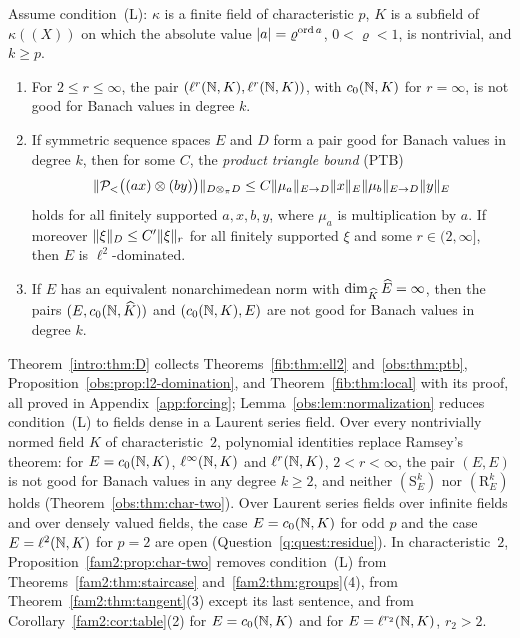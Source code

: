 \begin{introtheorem}[forcing]\label{intro:thm:D}
Assume condition~\textup{(L)}: $\kappa$ is a finite field of characteristic $p$, $K$ is a subfield of $\kappa((X))$ on
which the absolute value $\lvert a\rvert=\varrho^{\operatorname{ord} a}$, $0<\varrho<1$, is nontrivial, and $k\ge p$.
\begin{enumerate}
\item For $2\le r\le\infty$, the pair $(\ell^r(\mathbb N,K),\ell^r(\mathbb N,K))$, with $c_0(\mathbb N,K)$ for $r=\infty$, is not good for
Banach values in degree $k$.
\item If symmetric sequence spaces $E$ and $D$ form a pair good for Banach values in degree $k$, then for some $C$, the
\emph{product triangle bound} \textup{(PTB)}
\[
 \lVert \mathcal P_<\bigl((ax)\otimes(by)\bigr)\rVert_{D\otimes_\pi D}
 \le C\lVert \mu_a\rVert_{E\to D}\lVert x\rVert_E\lVert \mu_b\rVert_{E\to D}\lVert y\rVert_E
\]
holds for all finitely supported $a,x,b,y$, where $\mu_a$ is multiplication by $a$. If moreover
$\lVert \xi\rVert_D\le C'\lVert \xi\rVert_r$ for all finitely supported $\xi$ and some $r\in(2,\infty]$, then $E$ is $\ell^2$-dominated.
\item If $E$ has an equivalent nonarchimedean norm with $\dim_{\widehat K}\widehat E=\infty$, then the pairs
$(E,c_0(\mathbb N,\widehat K))$ and $(c_0(\mathbb N,K),E)$ are not good for Banach values in degree $k$.
\end{enumerate}
\end{introtheorem}

Theorem~\ref{intro:thm:D} collects Theorems~\ref{fib:thm:ell2} and~\ref{obs:thm:ptb},
Proposition~\ref{obs:prop:l2-domination}, and Theorem~\ref{fib:thm:local} with its proof, all proved in
Appendix~\ref{app:forcing}; Lemma~\ref{obs:lem:normalization} reduces condition~\textup{(L)} to fields dense in a
Laurent series field. Over every nontrivially normed field $K$ of characteristic~$2$, polynomial identities replace
Ramsey's theorem: for $E=c_0(\mathbb N,K)$, $\ell^\infty(\mathbb N,K)$ and $\ell^r(\mathbb N,K)$, $2<r<\infty$, the pair $(E,E)$ is not good for
Banach values in any degree $k\ge2$, and neither $(\mathrm S^k_E)$ nor $(\mathrm R^k_E)$ holds
(Theorem~\ref{obs:thm:char-two}). Over Laurent series fields over infinite fields and over densely valued fields, the
case $E=c_0(\mathbb N,K)$ for odd $p$ and the case $E=\ell^2(\mathbb N,K)$ for $p=2$ are open (Question~\ref{q:quest:residue}). In
characteristic~$2$, Proposition~\ref{fam2:prop:char-two} removes condition~\textup{(L)} from
Theorems~\ref{fam2:thm:staircase} and~\ref{fam2:thm:groups}(4), from Theorem~\ref{fam2:thm:tangent}(3) except its last
sentence, and from Corollary~\ref{fam2:cor:table}(2) for $E=c_0(\mathbb N,K)$ and for $E=\ell^{r_2}(\mathbb N,K)$, $r_2>2$.

